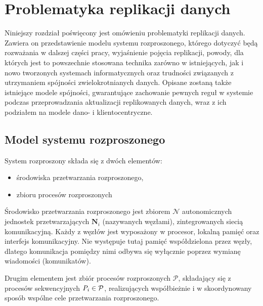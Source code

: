 \chapter{Problematyka replikacji danych} \label{chapter:replication}

Niniejszy rozdział poświęcony jest omówieniu problematyki replikacji danych. Zawiera on przedstawienie modelu systemu rozproszonego, którego dotyczyć będą rozważania w dalszej części pracy, wyjaśnienie pojęcia replikacji, powody, dla których jest to powszechnie stosowana technika zarówno w istniejących, jak i nowo tworzonych systemach informatycznych oraz trudności związanych z utrzymaniem spójności zwielokrotnianych danych. Opisane zostaną także istniejące modele spójności, gwarantujące zachowanie pewnych reguł w systemie podczas przeprowadzania aktualizacji replikowanych danych, wraz z ich podziałem na modele dano- i klientocentryczne.

\section{Model systemu rozproszonego} \label{section:system_model}

System rozproszony składa się z dwóch elementów:

\begin{itemize}
    \item środowiska przetwarzania rozproszonego,
    \item zbioru procesów rozproszonych
\end{itemize}

Środowisko przetwarzania rozproszonego jest zbiorem $ \mathcal{N} $ autonomicznych jednostek przetwarzających $ \textbf{N}_i $ (nazywanych węzłami), zintegrowanych siecią komunikacyjną. Każdy z węzłów jest wyposażony w procesor, lokalną pamięć oraz interfejs komunikacyjny. Nie występuje tutaj pamięć współdzielona przez węzły, dlatego komunikacja pomiędzy nimi odbywa się wyłącznie poprzez wymianę wiadomości (komunikatów).

Drugim elementem jest zbiór procesów rozproszonych $ \mathcal{P} $, składający się z procesów sekwencyjnych $ \emph{P}_i \in \mathcal{P} $, realizujących współbieżnie i w skoordynowany sposób wspólne cele przetwarzania rozproszonego.

